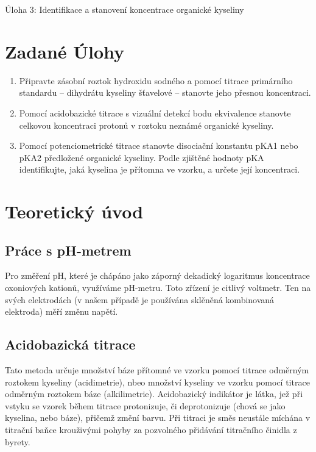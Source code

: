 \documentclass[13pt, a4paper, twoside]{article}
\begin{document}
\begin{center}
    \Huge
    Úloha 3: Identifikace a stanovení koncentrace organické kyseliny
\end{center}
\large
\onehalfspacing
\section*{Zadané Úlohy}
\begin{enumerate}
    \item Připravte zásobní roztok hydroxidu sodného a pomocí titrace primárního standardu –
    dihydrátu kyseliny šťavelové – stanovte jeho přesnou koncentraci.
    \item Pomocí acidobazické titrace s vizuální detekcí bodu ekvivalence stanovte celkovou
    koncentraci protonů v roztoku neznámé organické kyseliny.
    \item Pomocí potenciometrické titrace stanovte disociační konstantu pKA1 nebo pKA2 předložené
    organické kyseliny. Podle zjištěné hodnoty pKA identifikujte, jaká kyselina je přítomna ve
    vzorku, a určete její koncentraci.
\end{enumerate}
\section*{Teoretický úvod}
    \subsection*{Práce s pH-metrem}
        Pro změření pH, které je chápáno jako záporný dekadický logaritmus koncentrace
        oxoniových kationů, využíváme pH-metru. Toto zřízení je citlivý voltmetr. Ten
        na svých elektrodách (v našem případě je používána sklěněná kombinovaná elektroda)
        měří změnu napětí.
    \subsection*{Acidobazická titrace}
    Tato metoda určuje množství báze přítomné ve vzorku pomocí titrace odměrným roztokem
    kyseliny (acidimetrie), nbeo množství kyseliny ve vzorku pomocí titrace odměrným
    roztokem báze (alkilimetrie). Acidobazický indikátor je látka, jež při vstyku se vzorek
    během titrace protonizuje, či deprotonizuje (chová se jako kyselina, nebo báze), přičemž
    změní barvu. Při titraci je směs neustále míchána v titrační baňce krouživými pohyby
    za pozvolného přidávání titračního činidla z byrety.
    
\end{document}

